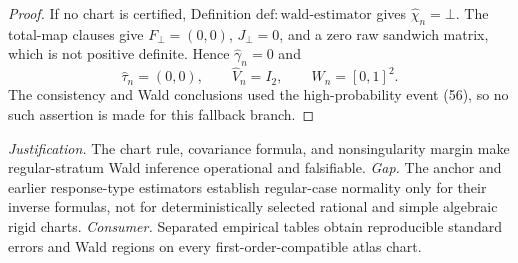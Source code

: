 \documentclass{article}
\begin{document}
\begin{proof}
If no chart is certified, Definition \(\mathrm{def{:}wald\text{-}estimator}\) gives \(\widehat\chi_n=\bot\).  The total-map clauses give \(F_{\bot}=(0,0)\), \(J_{\bot}=0\), and a zero raw sandwich matrix, which is not positive definite.  Hence \(\widehat\gamma_n=0\) and
\[
 \widehat\tau_n=(0,0),\qquad
 \widehat V_n=I_2,\qquad
 W_n=[0,1]^2.                                              \tag{64}
\]
The consistency and Wald conclusions used the high-probability event (56), so no such assertion is made for this fallback branch.
\end{proof}
\par\smallskip\noindent \textit{Justification.} The chart rule, covariance formula, and nonsingularity margin make regular-stratum Wald inference operational and falsifiable. \textit{Gap.} The anchor and earlier response-type estimators establish regular-case normality only for their inverse formulas, not for deterministically selected rational and simple algebraic rigid charts. \textit{Consumer.} Separated empirical tables obtain reproducible standard errors and Wald regions on every first-order-compatible atlas chart.
\end{document}
